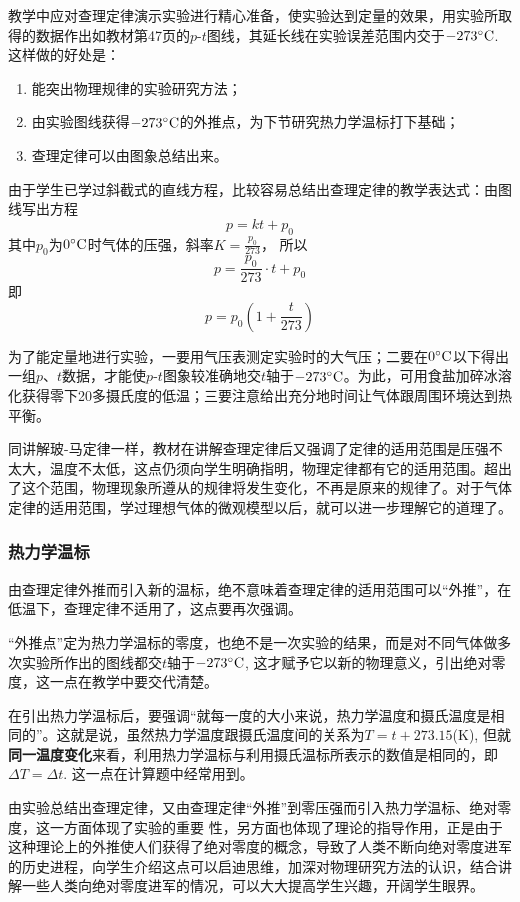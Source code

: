  教学中应对查理定律演示实验进行精心准备，使实验达到定量的效果，用实验所取得的数据作出如教材第47页的$p$-$t$图线，其延长线在实验误差范围内交于$-273^{\circ}{\rm C}$. 这样做的好处是：
 \begin{enumerate}
     \item 能突出物理规律的实验研究方法；
     \item 由实验图线获得$-273^{\circ}{\rm C}$的外推点，为下节研究热力学温标打下基础；
     \item 查理定律可以由图象总结出来。
 \end{enumerate}

 由于学生已学过斜截式的直线方程，比较容易总结出查理定律的教学表达式：由图线写出方程
\[p=kt+p_0\]
其中$p_0$为$0^{\circ}{\rm C}$时气体的压强，斜率$K=\frac{p_0}{273}$，
所以
\[p=\frac{p_0}{273}\cdot t+p_0\]
即
\[p=p_0\left(1+\frac{t}{273}\right)\]

为了能定量地进行实验，一要用气压表测定实验时的大气压；二要在$0^{\circ}{\rm C}$以下得出一组$p$、$t$数据，才能使$p$-$t$图象较准确地交$t$轴于${\rm -273^{\circ}C}$。为此，可用食盐加碎冰溶化获得零下20多摄氏度的低温；三要注意给出充分地时间让气体跟周围环境达到热平衡。

同讲解玻-马定律一样，教材在讲解查理定律后又强调了定律的适用范围是压强不太大，温度不太低，这点仍须向学生明确指明，物理定律都有它的适用范围。超出了这个范围，物理现象所遵从的规律将发生变化，不再是原来的规律了。对于气体定律的适用范围，学过理想气体的微观模型以后，就可以进一步理解它的道理了。

\subsubsection{热力学温标}

由查理定律外推而引入新的温标，绝不意味着查理定律的适用范围可以“外推”，在低温下，查理定律不适用了，这点要再次强调。

“外推点”定为热力学温标的零度，也绝不是一次实验的结果，而是对不同气体做多次实验所作出的图线都交$t$轴于${\rm -273^{\circ}C}$, 这才赋予它以新的物理意义，引出绝对零度，这一点在教学中要交代清楚。

在引出热力学温标后，要强调“就每一度的大小来说，热力学温度和摄氏温度是相同的”。这就是说，虽然热力学温度跟摄氏温度间的关系为$T=t+273.15$(K), 但就\textbf{同一温度变化}来看，利用热力学温标与利用摄氏温标所表示的数值是相同的，即$\Delta T=\Delta t$. 这一点在计算题中经常用到。

由实验总结出查理定律，又由查理定律“外推”到零压强而引入热力学温标、绝对零度，这一方面体现了实验的重要
性，另方面也体现了理论的指导作用，正是由于这种理论上的外推使人们获得了绝对零度的概念，导致了人类不断向绝对零度进军的历史进程，向学生介绍这点可以启迪思维，加深对物理研究方法的认识，结合讲解一些人类向绝对零度进军的情况，可以大大提高学生兴趣，开阔学生眼界。

